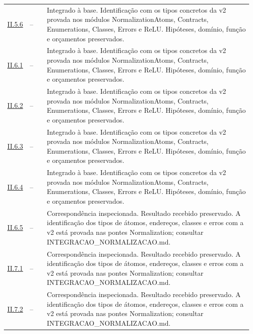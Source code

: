 \documentclass[12pt,a4paper]{article}
\theoremstyle{preciso}
\theoremstyle{definition}
\theoremstyle{preciso}
\theoremstyle{preciso}
\theoremstyle{preciso}
\theoremstyle{preciso}
\theoremstyle{definition}
\theoremstyle{preciso}
\theoremstyle{definition}
\theoremstyle{preciso}
\theoremstyle{preciso}
\theoremstyle{definition}
\begin{document}
\begin{singlespace}
\begin{longtable}{@{}p{.11\linewidth}p{.09\linewidth}p{.09\linewidth}p{.59\linewidth}@{}}
\hyperref[map:normalizacao:5.6]{II.5.6} & -- & \pageref{map:normalizacao:5.6} & Integrado à base. Identificação com os tipos concretos da v2 provada nos módulos NormalizationAtoms, Contracts, Enumerations, Classes, Errors e ReLU. Hipóteses, domínio, função e orçamentos preservados.\\[4pt]
\hyperref[map:normalizacao:6.1]{II.6.1} & -- & \pageref{map:normalizacao:6.1} & Integrado à base. Identificação com os tipos concretos da v2 provada nos módulos NormalizationAtoms, Contracts, Enumerations, Classes, Errors e ReLU. Hipóteses, domínio, função e orçamentos preservados.\\[4pt]
\hyperref[map:normalizacao:6.2]{II.6.2} & -- & \pageref{map:normalizacao:6.2} & Integrado à base. Identificação com os tipos concretos da v2 provada nos módulos NormalizationAtoms, Contracts, Enumerations, Classes, Errors e ReLU. Hipóteses, domínio, função e orçamentos preservados.\\[4pt]
\hyperref[map:normalizacao:6.3]{II.6.3} & -- & \pageref{map:normalizacao:6.3} & Integrado à base. Identificação com os tipos concretos da v2 provada nos módulos NormalizationAtoms, Contracts, Enumerations, Classes, Errors e ReLU. Hipóteses, domínio, função e orçamentos preservados.\\[4pt]
\hyperref[map:normalizacao:6.4]{II.6.4} & -- & \pageref{map:normalizacao:6.4} & Integrado à base. Identificação com os tipos concretos da v2 provada nos módulos NormalizationAtoms, Contracts, Enumerations, Classes, Errors e ReLU. Hipóteses, domínio, função e orçamentos preservados.\\[4pt]
\hyperref[map:normalizacao:6.5]{II.6.5} & -- & \pageref{map:normalizacao:6.5} & Correspondência inspecionada. Resultado recebido preservado. A identificação dos tipos de átomos, endereços, classes e erros com a v2 está provada nas pontes Normalization; consultar INTEGRACAO\_NORMALIZACAO.md.\\[4pt]
\hyperref[map:normalizacao:7.1]{II.7.1} & -- & \pageref{map:normalizacao:7.1} & Correspondência inspecionada. Resultado recebido preservado. A identificação dos tipos de átomos, endereços, classes e erros com a v2 está provada nas pontes Normalization; consultar INTEGRACAO\_NORMALIZACAO.md.\\[4pt]
\hyperref[map:normalizacao:7.2]{II.7.2} & -- & \pageref{map:normalizacao:7.2} & Correspondência inspecionada. Resultado recebido preservado. A identificação dos tipos de átomos, endereços, classes e erros com a v2 está provada nas pontes Normalization; consultar INTEGRACAO\_NORMALIZACAO.md.\\[4pt]

\end{longtable}
\end{singlespace}
\end{document}

